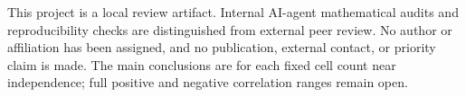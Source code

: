 This project is a local review artifact. Internal AI-agent mathematical audits
and reproducibility checks are distinguished from external peer review.
No author or affiliation has been assigned, and no publication, external
contact, or priority claim is made. The main conclusions are for each fixed
cell count near independence; full positive and negative correlation
ranges remain open.

